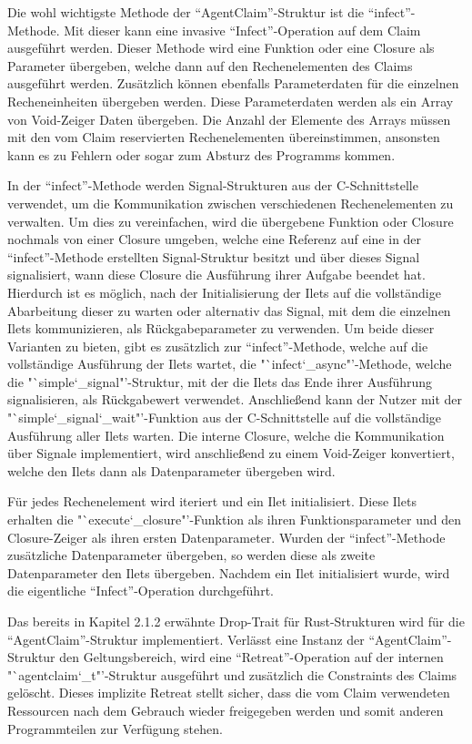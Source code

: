 Die wohl wichtigste Methode der "`AgentClaim"'-Struktur ist die "`infect"'-Methode. Mit dieser kann eine invasive "`Infect"'-Operation
auf dem Claim ausgeführt werden. Dieser Methode wird eine Funktion oder eine Closure als Parameter übergeben, welche dann auf den
Rechenelementen des Claims ausgeführt werden. Zusätzlich können ebenfalls Parameterdaten für die einzelnen Recheneinheiten
übergeben werden. Diese Parameterdaten werden als ein Array von Void-Zeiger Daten übergeben. Die Anzahl der Elemente des Arrays
müssen mit den vom Claim reservierten Rechenelementen übereinstimmen, ansonsten kann es zu Fehlern oder sogar zum Absturz
des Programms kommen.

In der "`infect"'-Methode werden Signal-Strukturen aus der C-Schnittstelle verwendet, um die Kommunikation zwischen verschiedenen 
Rechenelementen zu verwalten.
Um dies zu vereinfachen, wird die übergebene Funktion oder Closure nochmals von einer Closure umgeben, welche eine Referenz auf 
eine in der "`infect"'-Methode erstellten Signal-Struktur besitzt und über dieses Signal signalisiert, wann diese Closure
die Ausführung ihrer Aufgabe beendet hat. Hierdurch ist es möglich, nach der Initialisierung der Ilets auf die
vollständige Abarbeitung dieser zu warten oder alternativ das Signal, mit dem die einzelnen Ilets kommunizieren, als
Rückgabeparameter zu verwenden. Um beide dieser Varianten zu bieten, gibt es zusätzlich zur "`infect"'-Methode, welche
auf die vollständige Ausführung der Ilets wartet, die "`infect\char`_async"'-Methode, welche die "`simple\char`_signal"'-Struktur,
mit der die Ilets das Ende ihrer Ausführung signalisieren, als Rückgabewert verwendet. Anschließend kann der Nutzer mit der 
"`simple\char`_signal\char`_wait"'-Funktion aus der C-Schnittstelle auf die vollständige Ausführung aller Ilets warten.
Die interne Closure, welche die Kommunikation über Signale implementiert, wird anschließend zu einem Void-Zeiger konvertiert,
welche den Ilets dann als Datenparameter übergeben wird.

Für jedes %
Rechenelement wird iteriert und ein Ilet initialisiert. Diese Ilets erhalten die "`execute\char`_closure"'-Funktion als ihren
Funktionsparameter und den Closure-Zeiger als ihren ersten Datenparameter. Wurden der "`infect"'-Methode zusätzliche Datenparameter
übergeben, so werden diese als zweite Datenparameter den Ilets übergeben. Nachdem ein Ilet initialisiert wurde, wird
die eigentliche "`Infect"'-Operation durchgeführt.

Das bereits in Kapitel 2.1.2 erwähnte Drop-Trait für Rust-Strukturen wird für die "`AgentClaim"'-Struktur implementiert.
Verlässt eine Instanz der "`AgentClaim"'-Struktur den Geltungsbereich, wird eine "`Retreat"'-Operation auf der
internen "`agentclaim\char`_t"'-Struktur ausgeführt und zusätzlich die Constraints des Claims gelöscht. Dieses implizite Retreat
stellt sicher, dass die vom Claim verwendeten Ressourcen nach dem Gebrauch wieder freigegeben werden und somit anderen
Programmteilen zur Verfügung stehen.
